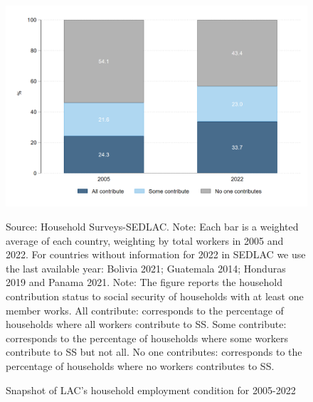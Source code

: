 \documentclass[english]{article}
\begin{document}
\begin{figure}[H]
    \justifying
     \caption{Snapshot of LAC’s household employment condition for 2005-2022}     
     \centerline{\includegraphics[scale=.3]{latex/figures/Household/snapshot_household_2005-2022_LAC}
    \label{fig:HouseholdLAC}}
    \footnotesize{Source: Household Surveys-SEDLAC.}
    \footnotesize{Note: Each bar is a weighted average of each country, weighting by total workers in 2005 and 2022. For countries without information for 2022 in SEDLAC we use the last available year: Bolivia 2021; Guatemala 2014; Honduras 2019 and Panama 2021.}
     \footnotesize{Note: The figure reports the household contribution status to social security of households with at least one member works. All contribute: corresponds to the percentage of households where all workers contribute to SS. Some contribute: corresponds to the percentage of households where some workers contribute to SS but not all. No one contributes: corresponds to the percentage of households where no workers contributes to SS.}
\end{figure}
\end{document}
